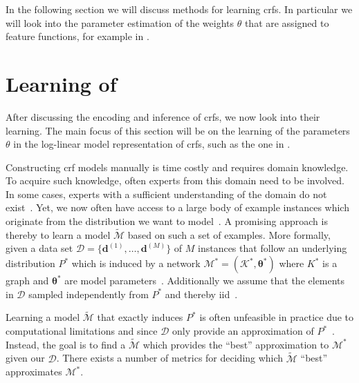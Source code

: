 \bigskip

In the following section we will discuss methods for learning \glspl{crf}.
In particular we will look into the parameter estimation of the weights $\theta$ that are assigned to \glspl{feature function}, for example in .

\section{Learning of }\label{sec:learning-crfs}

After discussing the encoding and inference of \glspl{crf}, we now look into their learning.
The main focus of this section will be on the learning of the parameters $\theta$ in the \gls{log-linear model} representation of \glspl{crf}, such as the one in .

\bigskip

Constructing \gls{crf} models manually is time costly and requires domain knowledge.
To acquire such knowledge, often experts from this domain need to be involved.
In some cases, experts with a sufficient understanding of the domain do not exist~\citep{koller2009probabilistic}.
Yet, we now often have access to a large body of example instances which originate from the distribution we want to model~\citep{koller2009probabilistic}.
A promising approach is thereby to learn a model $\mathcal{\tilde{M}}$ based on such a set of examples.
More formally, given a data set $\mathcal{D}=\{\bm{d}^{(1)},\dots,\bm{d}^{(M)}\}$ of $M$ instances that follow an underlying distribution $P^*$ which is induced by a network $\mathcal{M}^*=(\mathcal{K}^*,\bm{\theta}^*)$ where $K^*$ is a graph and $\bm{\theta}^*$ are model parameters~\citep{koller2009probabilistic}.
Additionally we assume that the elements in $\mathcal{D}$ sampled independently from $P^*$ and thereby \acrfull{iid}~\citep{koller2009probabilistic}.

\bigskip

Learning a model $\mathcal{\tilde{M}}$ that exactly induces $P^*$ is often unfeasible in practice due to computational limitations and since $\mathcal{D}$ only provide an approximation of $P^*$~\citep{koller2009probabilistic}.
Instead, the goal is to find a $\mathcal{\tilde{M}}$ which provides the ``best'' approximation to $\mathcal{M}^*$ given our $\mathcal{D}$.
There exists a number of metrics for deciding which $\mathcal{\tilde{M}}$ ``best'' approximates $\mathcal{M}^*$.

